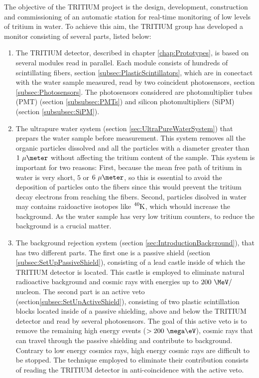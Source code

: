 The objective of the TRITIUM project is the design, development, construction and commissioning of an automatic station for real-time monitoring of low levels of tritium in water. To achieve this aim, the TRITIUM group has developed a monitor consisting of several parts, listed below: 

\begin{enumerate}

\item{} The TRITIUM detector, described in chapter \ref{chap:Prototypes}, is based on several modules read in parallel. Each module consists of hundreds of scintillating fibers, section \ref{subsec:PlasticScintillators}, which are in conectact with the water sample measured, read by two coincident photosensors, section \ref{subsec:Photosensors}. The photosensors considered are photomultiplier tubes (PMT) (section \ref{subsubsec:PMTs}) and silicon photomultipliers (SiPM) (section \ref{subsubsec:SiPM}).

\item{} The ultrapure water system (section \ref{sec:UltraPureWaterSystem}) that prepars the water sample before measurement. This system removes all the organic particles dissolved and all the particles with a diameter greater than $1~\mu\meter$ without affecting the tritium content of the sample. This system is important for two reasons: First, because the mean free path of tritium in water is very short, $5$ or $6~\mu\meter$,  so this is essential to avoid the deposition of particles onto the fibers since this would prevent the tritium decay electrons from reaching the fibers. Second, particles disolved in water may contains raidoactive isotopes like $\ce{^{40}K}$, which whould increase the background. As the water sample has very low tritium counters, to reduce the background is a crucial matter.

\item{} The background rejection system (section \ref{sec:IntroductionBackground}), that has two different parts. The first one is a passive shield (section \ref{subsec:SetUpPassiveShield}), consisting of a lead castle inside of which the TRITIUM detector is located. This castle is employed to eliminate natural radioactive background and cosmic rays with energies up to $200~\MeV/$nucleon. The second part is an active veto (section\ref{subsec:SetUpActiveShield}), consisting of two plastic scintillation blocks located inside of a passive shielding, above and below the TRITIUM detector and read by several photosensors. The goal of this active veto is to remove the remaining high energy events ($>200~\mega\eV$), cosmic rays that can travel through the passive shielding and contribute to background. Contrary to low energy cosmics rays, high energy cosmic rays are difficult to be stopped. The technique employed to eliminate their contribution consists of reading the TRITIUM detector in anti-coincidence with the active veto.


\end{enumerate}

